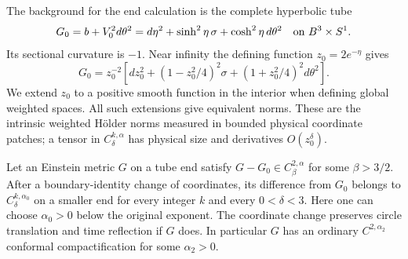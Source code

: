 The background for the end calculation is the complete hyperbolic
tube
\begin{equation}
 G_0=b+V_0^2d\theta^2
 =d\eta^2+\sinh^2\eta\,\sigma+\cosh^2\eta\,d\theta^2
 \quad\hbox{on }B^3\times S^1.
 \label{st-hyperbolic-tube}
\end{equation}
Its sectional curvature is $-1$.  Near infinity the defining
function $z_0=2e^{-\eta}$ gives
\begin{equation}
 G_0=z_0^{-2}\left[
 dz_0^2+(1-z_0^2/4)^2\sigma+(1+z_0^2/4)^2d\theta^2
 \right].
 \label{st-tube-compactification}
\end{equation}
We extend $z_0$ to a positive smooth function in the interior when
defining global weighted spaces.  All such extensions give equivalent
norms.  These are the intrinsic weighted H\"older norms measured in
bounded physical coordinate patches; a tensor in $C^{k,\alpha}_\delta$
has physical size and derivatives $O(z_0^\delta)$.

\begin{lemma}
\label{st-weighted-gauge}
Let an Einstein metric $G$ on a tube end satisfy
$G-G_0\in C^{2,\alpha}_{\beta}$ for some $\beta>3/2$.
After a boundary-identity change of coordinates, its difference from
$G_0$ belongs to $C^{k,\alpha_0}_{\delta}$ on a smaller end for
every integer $k$ and every $0<\delta<3$.  Here one can choose
$\alpha_0>0$ below the original exponent.  The coordinate change
preserves circle translation and time reflection if $G$ does.
In particular $G$ has an ordinary $C^{2,\alpha_2}$ conformal
compactification for some $\alpha_2>0$.
\end{lemma}

